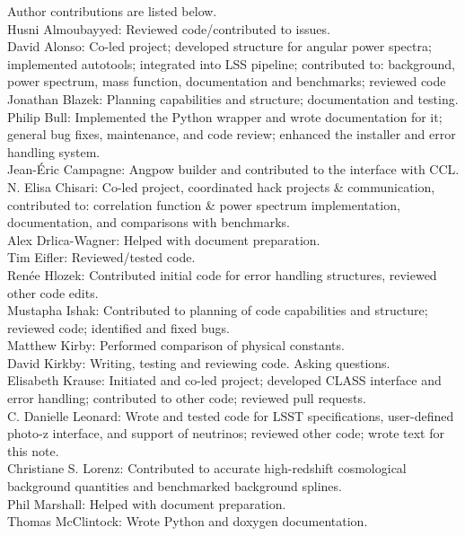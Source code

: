 Author contributions are listed below. \\
Husni Almoubayyed: Reviewed code/contributed to issues. \\
David Alonso: Co-led project; developed structure for angular power spectra; implemented autotools; integrated into LSS pipeline; contributed to: background, power spectrum, mass function, documentation and benchmarks; reviewed code \\
Jonathan Blazek: Planning capabilities and structure; documentation and testing. \\
Philip Bull: Implemented the Python wrapper and wrote documentation for it; general bug fixes, maintenance, and code review; enhanced the installer and error handling system. \\
Jean-\'Eric Campagne: Angpow builder and contributed to the interface with CCL. \\
N. Elisa Chisari: Co-led project, coordinated hack projects \& communication, contributed to: correlation function \& power spectrum implementation, documentation, and comparisons with benchmarks. \\
Alex Drlica-Wagner: Helped with document preparation. \\
Tim Eifler: Reviewed/tested code. \\
Ren\'ee Hlozek: Contributed initial code for error handling structures, reviewed other code edits. \\
Mustapha Ishak: Contributed to planning of code capabilities and structure; reviewed code; identified and fixed bugs. \\
Matthew Kirby: Performed comparison of physical constants. \\
David Kirkby: Writing, testing and reviewing code. Asking questions. \\
Elisabeth Krause: Initiated and co-led project; developed CLASS interface and error handling; contributed to other code; reviewed pull requests. \\
C. Danielle Leonard: Wrote and tested code for LSST specifications, user-defined photo-z interface, and support of neutrinos; reviewed other code; wrote text for this note. \\
Christiane S. Lorenz: Contributed to accurate high-redshift cosmological background quantities and benchmarked background splines. \\
Phil Marshall: Helped with document preparation. \\
Thomas McClintock: Wrote Python and doxygen documentation. \\
